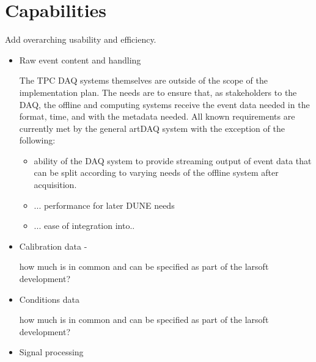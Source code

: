 
\chapter{ Capabilities }
\label{ch:capabilities}
Add overarching  usability and efficiency.
\begin {itemize}
\item Raw event content and handling

The TPC DAQ systems themselves are outside of the scope of the implementation plan. The needs are to ensure that, as stakeholders to the DAQ, the offline and computing systems receive the event data needed in the format, time, and with the metadata needed. 
All known requirements are currently met by the general artDAQ system with the exception of the following:
\begin{itemize} 
\item  ability of the DAQ system to provide streaming output of event data that can be split according to varying needs of the offline system after acquisition.
\item ... performance for later DUNE needs
\item ... ease of integration into.. 
\end {itemize}


\item Calibration data - 

how much is in common and can be specified as part of the larsoft development? 

\item Conditions data

how much is in common and can be specified as part of the larsoft development? 

\item Signal processing




\end{itemize}
